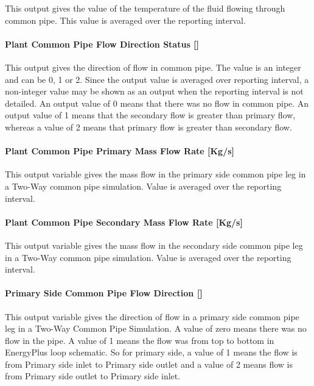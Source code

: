 This output gives the value of the temperature of the fluid flowing through common pipe. This value is averaged over the reporting interval.

\paragraph{Plant Common Pipe Flow Direction Status {[]}}\label{plant-common-pipe-flow-direction-status}

This output gives the direction of flow in common pipe. The value is an integer and can be 0, 1 or 2. Since the output value is averaged over reporting interval, a non-integer value may be shown as an output when the reporting interval is not detailed. An output value of 0 means that there was no flow in common pipe. An output value of 1 means that the secondary flow is greater than primary flow, whereas a value of 2 means that primary flow is greater than secondary flow.

\paragraph{Plant Common Pipe Primary Mass Flow Rate {[}Kg/s{]}}\label{plant-common-pipe-primary-mass-flow-rate-kgs}

This output variable gives the mass flow in the primary side common pipe leg in a Two-Way common pipe simulation. Value is averaged over the reporting interval.

\paragraph{Plant Common Pipe Secondary Mass Flow Rate {[}Kg/s{]}}\label{plant-common-pipe-secondary-mass-flow-rate-kgs}

This output variable gives the mass flow in the secondary side common pipe leg in a Two-Way common pipe simulation. Value is averaged over the reporting interval.

\paragraph{Primary Side Common Pipe Flow Direction {[]}}\label{primary-side-common-pipe-flow-direction}

This output variable gives the direction of flow in a primary side common pipe leg in a Two-Way Common Pipe Simulation. A value of zero means there was no flow in the pipe. A value of 1 means the flow was from top to bottom in EnergyPlus loop schematic. So for primary side, a value of 1 means the flow is from Primary side inlet to Primary side outlet and a value of 2 means flow is from Primary side outlet to Primary side inlet.

